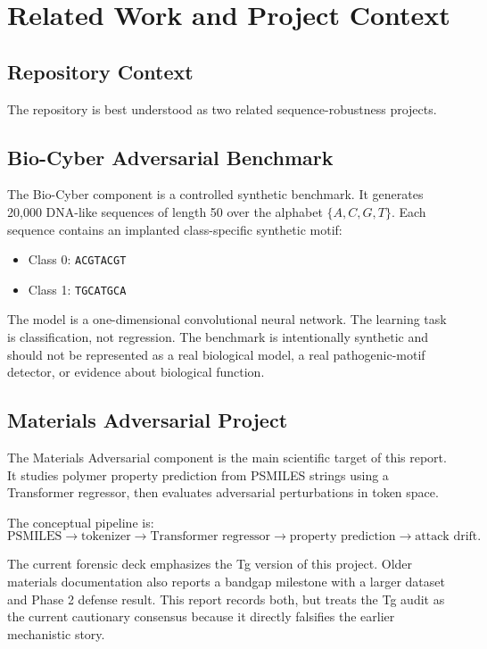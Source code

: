 \documentclass[11pt]{article}
\begin{document}
\section{Related Work and Project Context}

\subsection{Repository Context}

The repository is best understood as two related sequence-robustness projects.

\subsection{Bio-Cyber Adversarial Benchmark}

The Bio-Cyber component is a controlled synthetic benchmark. It generates 20,000
DNA-like sequences of length 50 over the alphabet $\{A,C,G,T\}$. Each sequence
contains an implanted class-specific synthetic motif:
\begin{itemize}
  \item Class 0: \texttt{ACGTACGT}
  \item Class 1: \texttt{TGCATGCA}
\end{itemize}

The model is a one-dimensional convolutional neural network. The learning task is
classification, not regression. The benchmark is intentionally synthetic and
should not be represented as a real biological model, a real pathogenic-motif
detector, or evidence about biological function.

\subsection{Materials Adversarial Project}

The Materials Adversarial component is the main scientific target of this report.
It studies polymer property prediction from PSMILES strings using a Transformer
regressor, then evaluates adversarial perturbations in token space.

The conceptual pipeline is:
\[
\text{PSMILES} \rightarrow \text{tokenizer} \rightarrow \text{Transformer regressor}
\rightarrow \text{property prediction} \rightarrow \text{attack drift}.
\]

The current forensic deck emphasizes the Tg version of this project. Older
materials documentation also reports a bandgap milestone with a larger dataset
and Phase 2 defense result. This report records both, but treats the Tg audit as
the current cautionary consensus because it directly falsifies the earlier
mechanistic story.
\end{document}
